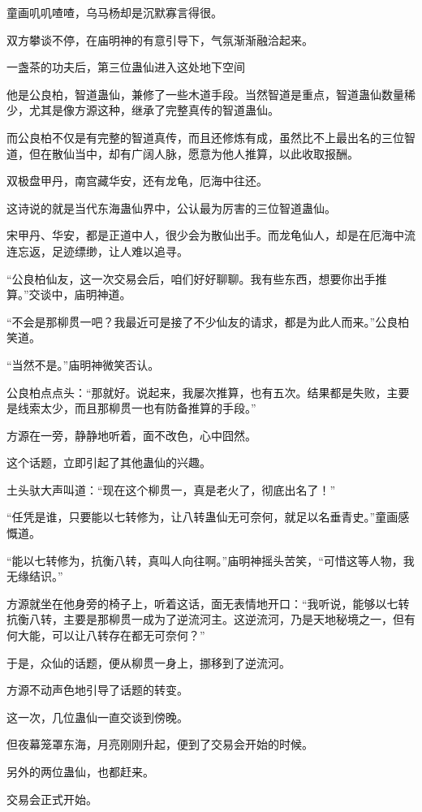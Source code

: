 \begin{this_body}
童画叽叽喳喳，乌马杨却是沉默寡言得很。

双方攀谈不停，在庙明神的有意引导下，气氛渐渐融洽起来。

一盏茶的功夫后，第三位蛊仙进入这处地下空间

他是公良柏，智道蛊仙，兼修了一些木道手段。当然智道是重点，智道蛊仙数量稀少，尤其是像方源这种，继承了完整真传的智道蛊仙。

而公良柏不仅是有完整的智道真传，而且还修炼有成，虽然比不上最出名的三位智道，但在散仙当中，却有广阔人脉，愿意为他人推算，以此收取报酬。

双极盘甲丹，南宫藏华安，还有龙龟，厄海中往还。

这诗说的就是当代东海蛊仙界中，公认最为厉害的三位智道蛊仙。

宋甲丹、华安，都是正道中人，很少会为散仙出手。而龙龟仙人，却是在厄海中流连忘返，足迹缥缈，让人难以追寻。

“公良柏仙友，这一次交易会后，咱们好好聊聊。我有些东西，想要你出手推算。”交谈中，庙明神道。

“不会是那柳贯一吧？我最近可是接了不少仙友的请求，都是为此人而来。”公良柏笑道。

“当然不是。”庙明神微笑否认。

公良柏点点头：“那就好。说起来，我屡次推算，也有五次。结果都是失败，主要是线索太少，而且那柳贯一也有防备推算的手段。”

方源在一旁，静静地听着，面不改色，心中囧然。

这个话题，立即引起了其他蛊仙的兴趣。

土头驮大声叫道：“现在这个柳贯一，真是老火了，彻底出名了！”

“任凭是谁，只要能以七转修为，让八转蛊仙无可奈何，就足以名垂青史。”童画感慨道。

“能以七转修为，抗衡八转，真叫人向往啊。”庙明神摇头苦笑，“可惜这等人物，我无缘结识。”

方源就坐在他身旁的椅子上，听着这话，面无表情地开口：“我听说，能够以七转抗衡八转，主要是那柳贯一成为了逆流河主。这逆流河，乃是天地秘境之一，但有何大能，可以让八转存在都无可奈何？”

于是，众仙的话题，便从柳贯一身上，挪移到了逆流河。

方源不动声色地引导了话题的转变。

这一次，几位蛊仙一直交谈到傍晚。

但夜幕笼罩东海，月亮刚刚升起，便到了交易会开始的时候。

另外的两位蛊仙，也都赶来。

交易会正式开始。


\end{this_body}
